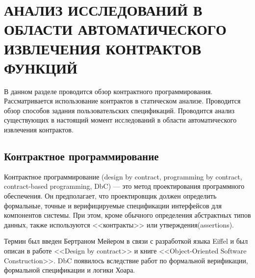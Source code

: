 \chapter{АНАЛИЗ ИССЛЕДОВАНИЙ В ОБЛАСТИ АВТОМАТИЧЕСКОГО ИЗВЛЕЧЕНИЯ КОНТРАКТОВ ФУНКЦИЙ}
\label{chapter:analysis}
В данном разделе проводится обзор контрактного программирования. Рассматривается использование контрактов в статическом анализе. Проводится обзор способов задания пользовательских спецификаций. Проводится анализ существующих в настоящий момент исследований в области автоматического извлечения контрактов.

\section{Контрактное программирование}
Контрактное программирование (design by contract, programming by contract, contract-based programming, DbC) --- это метод проектирования программного обеспечения. Он предполагает, что проектировщик должен определить формальные, точные и верифицируемые спецификации интерфейсов для компонентов системы. При этом, кроме обычного определения абстрактных типов данных, также используются <<контракты>> или утверждения(assertions).

Термин был введен Бертраном Мейером в связи с разработкой языка Eiffel и был описан в работе <<Design by contract>>\cite{designByContract} и книге <<Object-Oriented Software Construction>>\cite{oosc-meyer}. DbC появилось вследствие работ по формальной верификации, формальной спецификации и логики Хоара.

